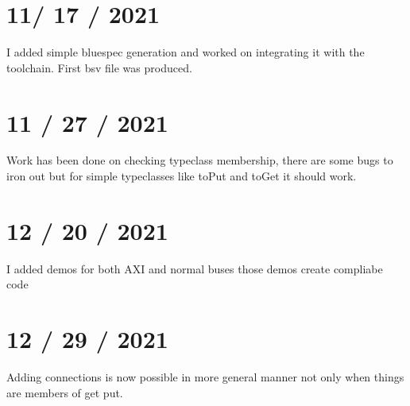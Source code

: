 \documentclass{article}
\begin{document}
\section{11/ 17 / 2021}
    I added simple bluespec generation and worked on integrating it with the toolchain. First bsv file was produced.

\section{11 / 27 / 2021}
    Work has been done on checking typeclass membership, there are some bugs to iron out but for simple typeclasses like toPut and toGet it should work.

\section{12 / 20 / 2021}
    I added demos for both AXI and normal buses those demos create compliabe code
\section{12 / 29 / 2021}
    Adding connections is now possible in more general manner not only when things are members of get put. 


    
\end{document}
